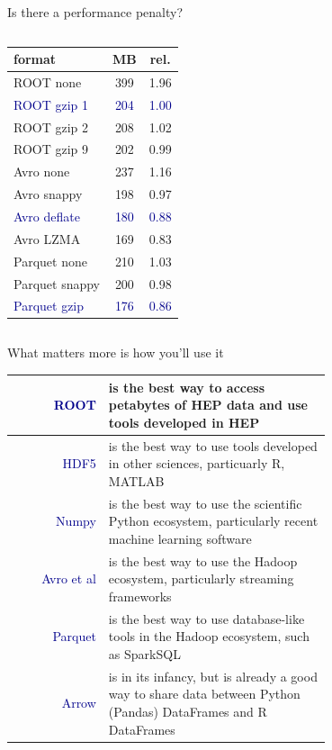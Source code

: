 \documentclass{beamer}
\begin{document}
\begin{frame}{Is there a performance penalty?}
\begin{columns}
\begin{column}{0.5\linewidth}
\begin{onlyenv}
\begin{center}
\vspace{0.5 cm}
\small
\begin{tabular}{l c c}
format         & MB  & rel. \\\hline
ROOT none      & 399 & 1.96 \\
\textcolor{darkblue}{ROOT gzip 1}    & \textcolor{darkblue}{204} & \textcolor{darkblue}{1.00} \\
ROOT gzip 2    & 208 & 1.02 \\
ROOT gzip 9    & 202 & 0.99 \\\hline
Avro none      & 237 & 1.16 \\
Avro snappy    & 198 & 0.97 \\
\textcolor{darkblue}{Avro deflate}   & \textcolor{darkblue}{180} & \textcolor{darkblue}{0.88} \\
Avro LZMA      & 169 & 0.83 \\\hline
Parquet none   & 210 & 1.03 \\
Parquet snappy & 200 & 0.98 \\
\textcolor{darkblue}{Parquet gzip}   & \textcolor{darkblue}{176} & \textcolor{darkblue}{0.86} \\
\end{tabular}
\end{center}
\end{onlyenv}
\end{column}
\end{columns}
\end{frame}

\begin{frame}{What matters more is how you'll use it}
\vspace{0.5 cm}
\begin{center}
\renewcommand{\arraystretch}{1.3}
\begin{tabular}{r p{0.7\linewidth}}
\textcolor{darkblue}{ROOT} & is the best way to access petabytes of HEP data and use tools developed in HEP \\\hline
\textcolor{darkblue}{HDF5} & is the best way to use tools developed in other sciences, particuarly R, MATLAB \\\hline
\textcolor{darkblue}{Numpy} & is the best way to use the scientific Python ecosystem, particularly recent machine learning software \\\hline
\textcolor{darkblue}{Avro et al} & is the best way to use the Hadoop ecosystem, particularly streaming frameworks \\\hline
\textcolor{darkblue}{Parquet} & is the best way to use database-like tools in the Hadoop ecosystem, such as SparkSQL \\\hline
\textcolor{darkblue}{Arrow} & is in its infancy, but is already a good way to share data between Python (Pandas) DataFrames and R DataFrames \\
\end{tabular}
\end{center}
\end{frame}
\end{document}
